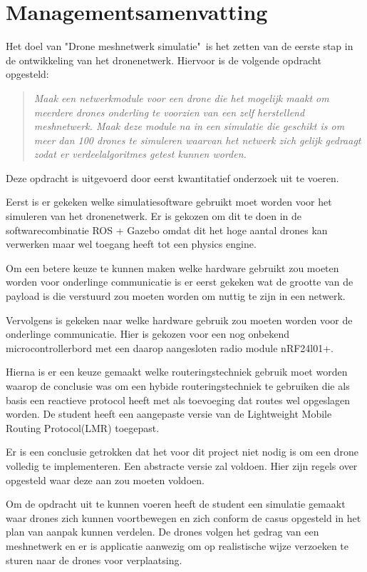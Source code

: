 \documentclass[a4paper, 11pt, oneside]{report}
\begin{document}
\chapter*{Managementsamenvatting}\label{sec:managementsamenvatting}
Het doel van "Drone meshnetwerk simulatie"\ is het zetten van de eerste stap in de ontwikkeling van het
dronenetwerk. Hiervoor is de volgende opdracht opgesteld:
\begin{quotation}
	\textit{Maak een netwerkmodule voor een drone die het mogelijk maakt om meerdere drones onderling te voorzien van een zelf herstellend meshnetwerk. Maak deze module na in een simulatie die geschikt is om meer dan 100 drones te simuleren waarvan het netwerk zich gelijk gedraagt zodat er verdeelalgoritmes getest kunnen worden.}
\end{quotation}

Deze opdracht is uitgevoerd door eerst kwantitatief onderzoek uit te voeren.

Eerst is er gekeken welke simulatiesoftware gebruikt moet worden voor het simuleren van het dronenetwerk.
Er is gekozen om dit te doen in de softwarecombinatie ROS + Gazebo omdat dit het hoge aantal drones kan verwerken maar wel toegang heeft tot een physics engine.

Om een betere keuze te kunnen maken welke hardware gebruikt zou moeten worden voor onderlinge communicatie is er eerst gekeken wat de grootte van de payload is die verstuurd zou moeten worden om nuttig te zijn in een netwerk.

Vervolgens is gekeken naar welke hardware gebruik zou moeten worden voor de onderlinge communicatie. Hier is gekozen voor een nog onbekend microcontrollerbord met een daarop aangesloten radio module nRF24l01+.

Hierna is er een keuze gemaakt welke routeringstechniek gebruik moet worden waarop de conclusie was om een hybide routeringstechniek te gebruiken die als basis een reactieve protocol heeft met als toevoeging dat routes wel opgeslagen worden. De student heeft een aangepaste versie van de Lightweight Mobile Routing Protocol(LMR) toegepast. 

Er is een conclusie getrokken dat het voor dit project niet nodig is om een drone volledig te implementeren. Een abstracte versie zal voldoen. Hier zijn regels over opgesteld waar deze aan zou moeten voldoen. 

Om de opdracht uit te kunnen voeren heeft de student een simulatie gemaakt waar drones zich kunnen voortbewegen en zich conform de casus opgesteld in het plan van aanpak kunnen verdelen. De drones volgen het gedrag van een meshnetwerk en er is applicatie aanwezig om op realistische wijze verzoeken te sturen naar de drones voor verplaatsing. 
\end{document}
